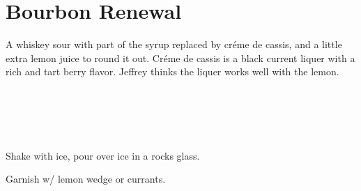 \section[Bourbon Renewal]{
    Bourbon Renewal
}

\begin{recipestats}[
        servings=1,
        preptime=5~\minute,
        original=\citeauthor{bourbonRenewalMorgenthaler}~\cite{bourbonRenewalMorgenthaler},
    ]
\end{recipestats}

\begin{recipeabstract}
    A whiskey sour with part of the syrup replaced by cr\'{e}me de cassis,
    and a little extra lemon juice to round it out.
    Cr\'{e}me de cassis is a black current liquer with a rich and tart berry flavor.
    Jeffrey thinks the liquer works well with the
    lemon\cite{bourbonRenewalMorgenthaler}.
\end{recipeabstract}

\begin{ingredientcolumns}
    \begin{ingredientblock}
        \\
    \end{ingredientblock}
    \begin{ingredientblock}
        \\
        \\
    \end{ingredientblock}
\end{ingredientcolumns}

\begin{preparation}
\item Shake with ice, pour over ice in a rocks glass.
\item Garnish w/ lemon wedge or currants.
\end{preparation}

\recipeend%
